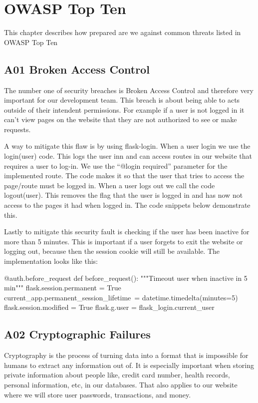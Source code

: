 
\chapter{OWASP Top Ten
}\label{kap:owasptopten}

This chapter describes how prepared are we against common threats listed in OWASP Top Ten

\section{A01 Broken Access Control}

The number one of security breaches is Broken Access Control and therefore very important for our development team. This breach is about being able to acts outside of their intendent permissions. For example if a user is not logged in it can’t view pages on the website that they are not authorized to see or make requests. 

A way to mitigate this flaw is by using flask-login. When a user login we use the login(user) code. This logs the user inn and can access routes in our website that requires a user to log-in. We use the “@login required” parameter for the implemented route. The code makes it so that the user that tries to access the page/route must be logged in. When a user logs out we call the code logout(user). This removes the flag that the user is logged in and has now not access to the pages it had when logged in. The code snippets below demonstrate this. 

Lastly to mitigate this security fault is checking if the user has been inactive for more than 5 minutes. This is important if a user forgets to exit the website or logging out, because then the session cookie will still be available. The implementation looks like this:

\begin{python}
@auth.before_request
def before_request():
    """Timeout user when inactive in 5 min"""
    flask.session.permanent = True
    current_app.permanent_session_lifetime\
        = datetime.timedelta(minutes=5)
    flask.session.modified = True
    flask.g.user = flask_login.current_user
\end{python}

\section{A02 Cryptographic Failures}
Cryptography is the process of turning data into a format that is impossible for humans to extract any information out of. It is especially important when storing private information about people like, credit card number, health records, personal information, etc, in our databases. That also applies to our website where we will store user passwords, transactions, and money.
